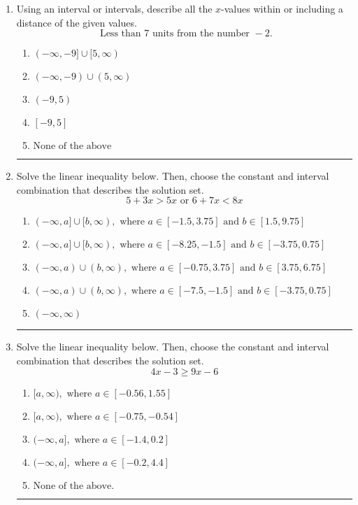 \documentclass[14pt]{extbook}
\newcommand{\litem}[1]{\item#1\hspace*{-1cm}\rule{\textwidth}{0.4pt}}
\begin{document}
\begin{enumerate}
{\begin{enumerate}[label=\Alph*.]
\end{enumerate} }
\litem{
Using an interval or intervals, describe all the $x$-values within or including a distance of the given values.\[ \text{ Less than } 7 \text{ units from the number } -2. \]\begin{enumerate}[label=\Alph*.]
\item \( (-\infty, -9] \cup [5, \infty) \)
\item \( (-\infty, -9) \cup (5, \infty) \)
\item \( (-9, 5) \)
\item \( [-9, 5] \)
\item \( \text{None of the above} \)

\end{enumerate} }
\litem{
Solve the linear inequality below. Then, choose the constant and interval combination that describes the solution set.\[ 5 + 3 x > 5 x \text{ or } 6 + 7 x < 8 x \]\begin{enumerate}[label=\Alph*.]
\item \( (-\infty, a] \cup [b, \infty), \text{ where } a \in [-1.5, 3.75] \text{ and } b \in [1.5, 9.75] \)
\item \( (-\infty, a] \cup [b, \infty), \text{ where } a \in [-8.25, -1.5] \text{ and } b \in [-3.75, 0.75] \)
\item \( (-\infty, a) \cup (b, \infty), \text{ where } a \in [-0.75, 3.75] \text{ and } b \in [3.75, 6.75] \)
\item \( (-\infty, a) \cup (b, \infty), \text{ where } a \in [-7.5, -1.5] \text{ and } b \in [-3.75, 0.75] \)
\item \( (-\infty, \infty) \)

\end{enumerate} }
\litem{
Solve the linear inequality below. Then, choose the constant and interval combination that describes the solution set.\[ 4x -3 \geq 9x -6 \]\begin{enumerate}[label=\Alph*.]
\item \( [a, \infty), \text{ where } a \in [-0.56, 1.55] \)
\item \( [a, \infty), \text{ where } a \in [-0.75, -0.54] \)
\item \( (-\infty, a], \text{ where } a \in [-1.4, 0.2] \)
\item \( (-\infty, a], \text{ where } a \in [-0.2, 4.4] \)
\item \( \text{None of the above}. \)

\end{enumerate} }
\end{enumerate}
\end{document}
